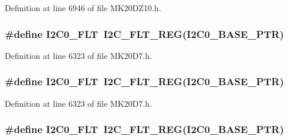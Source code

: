Definition at line 6946 of file M\+K20\+D\+Z10.\+h.

\subsubsection[{\texorpdfstring{I2\+C0\+\_\+\+F\+LT}{I2C0_FLT}}]{\setlength{\rightskip}{0pt plus 5cm}\#define I2\+C0\+\_\+\+F\+LT~{\bf I2\+C\+\_\+\+F\+L\+T\+\_\+\+R\+EG}({\bf I2\+C0\+\_\+\+B\+A\+S\+E\+\_\+\+P\+TR})}\hypertarget{group___i2_c___register___accessor___macros_gaf3513574714aeda95d4d19aa2f8c9a95}{}\label{group___i2_c___register___accessor___macros_gaf3513574714aeda95d4d19aa2f8c9a95}


Definition at line 6323 of file M\+K20\+D7.\+h.

\subsubsection[{\texorpdfstring{I2\+C0\+\_\+\+F\+LT}{I2C0_FLT}}]{\setlength{\rightskip}{0pt plus 5cm}\#define I2\+C0\+\_\+\+F\+LT~{\bf I2\+C\+\_\+\+F\+L\+T\+\_\+\+R\+EG}({\bf I2\+C0\+\_\+\+B\+A\+S\+E\+\_\+\+P\+TR})}\hypertarget{group___i2_c___register___accessor___macros_gaf3513574714aeda95d4d19aa2f8c9a95}{}\label{group___i2_c___register___accessor___macros_gaf3513574714aeda95d4d19aa2f8c9a95}


Definition at line 6323 of file M\+K20\+D7.\+h.

\subsubsection[{\texorpdfstring{I2\+C0\+\_\+\+F\+LT}{I2C0_FLT}}]{\setlength{\rightskip}{0pt plus 5cm}\#define I2\+C0\+\_\+\+F\+LT~{\bf I2\+C\+\_\+\+F\+L\+T\+\_\+\+R\+EG}({\bf I2\+C0\+\_\+\+B\+A\+S\+E\+\_\+\+P\+TR})}\hypertarget{group___i2_c___register___accessor___macros_gaf3513574714aeda95d4d19aa2f8c9a95}{}\label{group___i2_c___register___accessor___macros_gaf3513574714aeda95d4d19aa2f8c9a95}


